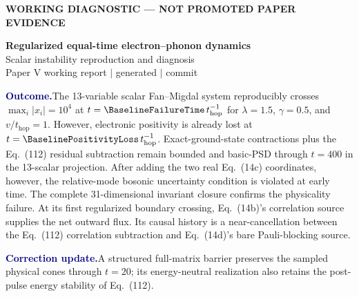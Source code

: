\documentclass[10pt]{article}
\newcommand{\statusbanner}{%
  \colorbox{amber}{%
    \parbox{\dimexpr\textwidth-2\fboxsep\relax}{%
      \centering\small\textbf{WORKING DIAGNOSTIC --- NOT PROMOTED PAPER EVIDENCE}%
    }%
  }%
}
\newcommand{\findingbox}[2]{%
  \colorbox{pale}{%
    \parbox{\dimexpr\linewidth-2\fboxsep\relax}{%
      \textcolor{navy}{\textbf{#1}}\quad #2%
    }%
  }%
}
\begin{document}
\statusbanner
\begin{center}
  \vspace{0.35em}
  {\LARGE\bfseries Regularized equal-time electron--phonon dynamics}\\[0.2em]
  {\Large Scalar instability reproduction and diagnosis}\\[0.35em]
  {\small Paper V working report \(\mid\) generated \ReportGeneratedAt
  \(\mid\) commit \ReportGitCommit}
\end{center}

\findingbox{Outcome.}{The 13-variable scalar Fan--Migdal system reproducibly
crosses \(\max_i|x_i|=10^4\) at
\(t=\BaselineFailureTime\,t_{\mathrm{hop}}^{-1}\) for
\(\lambda=1.5\), \(\gamma=0.5\), and \(v/t_{\mathrm{hop}}=1\).
However, electronic positivity is already lost at
\(t=\BaselinePositivityLoss\,t_{\mathrm{hop}}^{-1}\). Exact-ground-state
contractions plus the Eq.~(112) residual subtraction remain bounded and
    basic-PSD through \(t=400\) in the 13-scalar projection. After adding the two
    real Eq.~(14c) coordinates, however, the relative-mode bosonic uncertainty
    condition is violated at early time. The complete 31-dimensional invariant
    closure confirms the physicality failure. At its first regularized boundary
    crossing, Eq.~(14b)'s correlation source supplies the net outward flux.
    Its causal history is a near-cancellation between the Eq.~(112)
    correlation subtraction and Eq.~(14d)'s bare Pauli-blocking source.}

\findingbox{Correction update.}{A structured full-matrix barrier preserves the
sampled physical cones through \(t=20\); its energy-neutral realization also
retains the post-pulse energy stability of Eq.~(112).}
\end{document}

